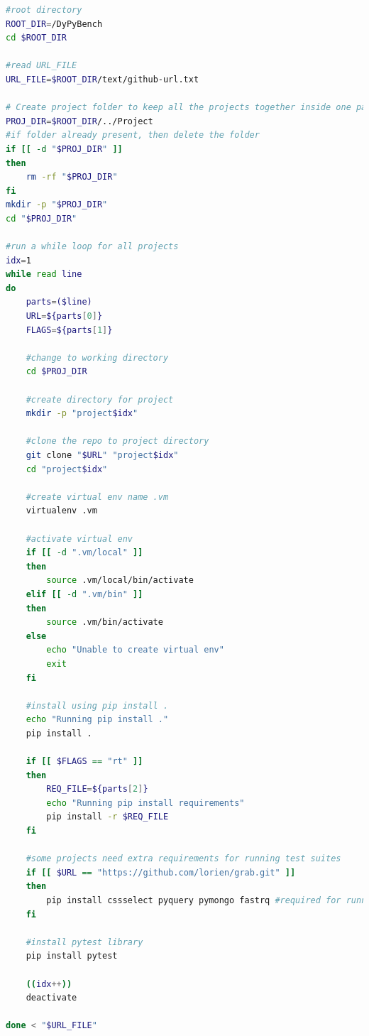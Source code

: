 \begin{lstlisting}[caption=Bash Script for Automation,label=code:install-all-projects1.sh,language=Bash]
#root directory
ROOT_DIR=/DyPyBench
cd $ROOT_DIR

#read URL_FILE
URL_FILE=$ROOT_DIR/text/github-url.txt

# Create project folder to keep all the projects together inside one parent folder
PROJ_DIR=$ROOT_DIR/../Project
#if folder already present, then delete the folder
if [[ -d "$PROJ_DIR" ]]
then
    rm -rf "$PROJ_DIR" 
fi
mkdir -p "$PROJ_DIR"
cd "$PROJ_DIR"

#run a while loop for all projects
idx=1
while read line
do
    parts=($line)
    URL=${parts[0]}
    FLAGS=${parts[1]}
    
    #change to working directory
    cd $PROJ_DIR
    
    #create directory for project
    mkdir -p "project$idx"
    
    #clone the repo to project directory
    git clone "$URL" "project$idx"
    cd "project$idx"
    
    #create virtual env name .vm
    virtualenv .vm
    
    #activate virtual env
    if [[ -d ".vm/local" ]]
    then
        source .vm/local/bin/activate
    elif [[ -d ".vm/bin" ]]
    then
        source .vm/bin/activate
    else
        echo "Unable to create virtual env"
        exit
    fi

    #install using pip install . 
    echo "Running pip install ."
    pip install .

    if [[ $FLAGS == "rt" ]]
    then
        REQ_FILE=${parts[2]}
        echo "Running pip install requirements"
        pip install -r $REQ_FILE
    fi

    #some projects need extra requirements for running test suites
    if [[ $URL == "https://github.com/lorien/grab.git" ]]
    then
        pip install cssselect pyquery pymongo fastrq #required for running tests
    fi

    #install pytest library
    pip install pytest
    
    ((idx++))
    deactivate

done < "$URL_FILE"
\end{lstlisting}

